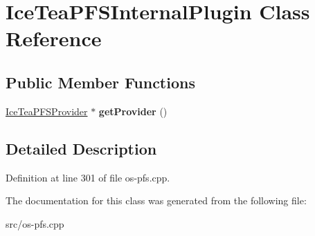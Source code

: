 \hypertarget{class_ice_tea_p_f_s_internal_plugin}{}\section{Ice\+Tea\+P\+F\+S\+Internal\+Plugin Class Reference}
\label{class_ice_tea_p_f_s_internal_plugin}
\subsection*{Public Member Functions}
\begin{DoxyCompactItemize}
\item 
\hyperlink{class_ice_tea_p_f_s_provider}{Ice\+Tea\+P\+F\+S\+Provider} $\ast$ {\bfseries get\+Provider} ()\hypertarget{class_ice_tea_p_f_s_internal_plugin_a578935ae5808b396742ed5b8a096f983}{}\label{class_ice_tea_p_f_s_internal_plugin_a578935ae5808b396742ed5b8a096f983}

\end{DoxyCompactItemize}


\subsection{Detailed Description}


Definition at line 301 of file os-\/pfs.\+cpp.



The documentation for this class was generated from the following file\+:\begin{DoxyCompactItemize}
\item 
src/os-\/pfs.\+cpp\end{DoxyCompactItemize}
